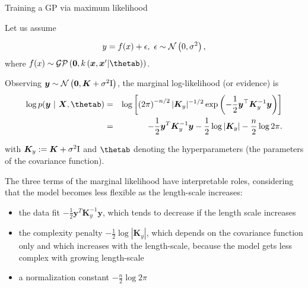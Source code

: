\begin{vbframe}{Training a GP via maximum likelihood}

Let us assume 

$$
	y = f(x) + \epsilon, ~ \epsilon \sim \mathcal{N}\left(0, \sigma^2\right),
$$
where $\fx \sim \mathcal{GP}\left(\bm{0}, k\left(\xv, \xv^\prime | \thetab \right)\right)$. 

\lz 

Observing $\bm{y} \sim \mathcal{N}\left(\bm{0}, \bm{K} + \sigma^2 \mathrm{I}\right)$, the marginal log-likelihood (or evidence) is
\begin{eqnarray*}
\log p(\bm{y} ~|~ \bm{X}, \thetab) &=& \log \left[\left(2 \pi\right)^{-n / 2} |\bm{K}_y|^{-1 / 2} \exp\left(- \frac{1}{2} \bm{y}^\top \bm{K}_y^{-1} \bm{y}\right) \right]\\
&=& -\frac{1}{2}\bm{y}^T\bm{K}_y^{-1} \bm{y} - \frac{1}{2} \log \left| \bm{K}_y \right| - \frac{n}{2} \log 2\pi. 
\end{eqnarray*}

with $\bm{K}_y:=\bm{K} + \sigma^2 \mathrm{I}$ and $\thetab$ denoting the hyperparameters (the parameters of the covariance function). 

\framebreak


The three terms of the marginal likelihood have interpretable roles, considering that 
the model becomes less flexible as the length-scale increases:

\begin{itemize}
\item the data fit $-\frac{1}{2}\bm{y}^T\bm{K}_y^{-1} \bm{y}$, which tends to decrease if the length scale increases
\item the complexity penalty $- \frac{1}{2} \log \left| \bm{K}_y \right|$, which depends on the covariance function only and which increases with the length-scale, because the model gets less complex with growing length-scale
\item a normalization constant $- \frac{n}{2} \log 2\pi$
\end{itemize}

\end{vbframe}

